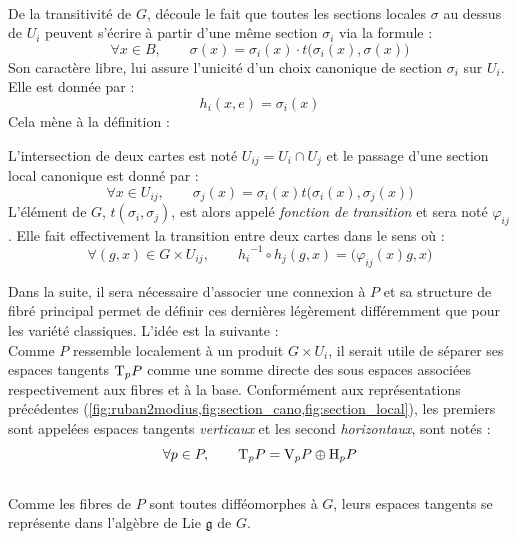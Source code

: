 \\
De la transitivité de $G$, découle le fait que toutes les sections locales $\sigma$ au dessus de $U_i$ peuvent s'écrire à partir d'une même section $\sigma_i$ via la formule :
\[\forall x\in B,\qquad \sigma(x) = \sigma_i(x) \cdot t\big(\sigma_i(x), \sigma(x)\big)\]
Son caractère libre, lui assure l'unicité d'un choix canonique de section $\sigma_i$ sur $U_i$. Elle est donnée par :
\[{h_i}(x,e) = \sigma_i(x)\]
Cela mène à la définition :
\begin{definition}
	L'intersection de deux cartes  est noté $U_{ij} = U_i\cap U_j$ et le passage d'une section local canonique est donné par :
	\[\forall x\in U_{ij},\qquad \sigma_j(x) = \sigma_i(x) t\big(\sigma_i(x), \sigma_j(x)\big)\]
	L'élément de $G$, $t(\sigma_i, \sigma_j)$, est alors appelé \emph{fonction de transition} et sera noté $\varphi_{ij}$. Elle fait effectivement la transition entre deux cartes dans le sens où :
	\[\forall (g,x)\in G\times U_{ij},\qquad {h_i}^{-1} \circ h_j(g,x) = \big( \varphi_{ij}(x)g, x \big)\]
\end{definition}
\skipl

Dans la suite, il sera nécessaire d'associer une connexion à $P$ et sa structure de fibré principal permet de définir ces dernières légèrement différemment que pour les variété classiques. L'idée est la suivante :
\\
Comme $P$ ressemble localement à un produit $G\times U_i$, il serait utile de séparer ses espaces tangents $\tg[p]{P}$ comme une somme directe des sous espaces associées respectivement aux fibres et à la base. Conformément aux représentations précédentes (\cref{fig:ruban2modius,fig:section_cano,fig:section_local}), les premiers sont appelées espaces tangents \emph{verticaux} et les second \emph{horizontaux}, sont notés :
\[\forall p\in P,\qquad \tg[p]{P} = \vg[p]{P} \oplus \hg[p]{P}\]
\\
Comme les fibres de $P$ sont toutes difféomorphes à $G$, leurs espaces tangents se représente dans l'algèbre de Lie $\mathfrak{g}$ de $G$. 

